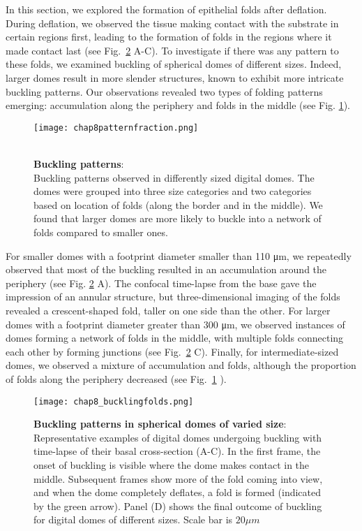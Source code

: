 In this section, we explored the formation of epithelial folds after deflation. During deflation, we observed the tissue making contact with the substrate in certain regions first, leading to the formation of folds in the regions where it made contact last (see Fig.~\ref{fig_8_6} A-C). To investigate if there was any pattern to these folds, we examined buckling of spherical domes of different sizes. Indeed, larger domes result in more slender structures, known to exhibit more intricate buckling patterns. Our observations revealed two types of folding patterns emerging: accumulation along the periphery and folds in the middle (see Fig. \ref{fig_8_5}).

\begin{figure}[h!]
	\begin{minipage}[c]{0.5\textwidth}
		\texttt{[image: chap8patternfraction.png]}
	\end{minipage}\hfill
	\begin{minipage}[c]{0.45\textwidth}
		\caption{\\ \textbf{Buckling patterns}:\\ 
			Buckling patterns observed in differently sized digital domes. The domes were grouped into three size categories and two categories based on location of folds (along the border and in the middle). We found that larger domes are more likely to buckle into a network of folds compared to smaller ones.
		} \label{fig_8_5}
	\end{minipage}
\end{figure}

For smaller domes with a footprint diameter smaller than 110 \unit{\um}, we repeatedly observed that most of the buckling resulted in an accumulation around the periphery (see Fig. \ref{fig_8_6} A). The confocal time-lapse from the base gave the impression of an annular structure, but three-dimensional imaging of the folds revealed a crescent-shaped fold, taller on one side than the other. For larger domes with a footprint diameter greater than 300 \unit{\um}, we observed instances of domes forming a network of folds in the middle, with multiple folds connecting each other by forming junctions (see Fig.~\ref{fig_8_6} C). Finally, for intermediate-sized domes, we observed a mixture of accumulation and folds, although the proportion of folds along the periphery decreased (see Fig.~\ref{fig_8_5} ).

\begin{figure}[h!]
	\centering
	\texttt{[image: chap8\_bucklingfolds.png]}
	\caption{\label{fig_8_6} \textbf{Buckling patterns in spherical domes of varied size}: Representative examples of digital domes undergoing buckling with time-lapse of their basal cross-section (A-C). In the first frame, the onset of buckling is visible where the dome makes contact in the middle. Subsequent frames show more of the fold coming into view, and when the dome completely deflates, a fold is formed (indicated by the green arrow). Panel (D) shows the final outcome of buckling for digital domes of different sizes. Scale bar is $20 \mu m$	}
\end{figure}
\clearpage

